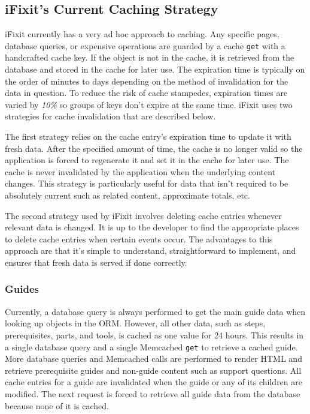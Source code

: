 \documentclass[12pt]{ucthesis}
\begin{document}
\subsection{iFixit's Current Caching Strategy}
\textsf{iFixit} currently has a very ad hoc approach to caching.
Any specific pages, database queries, or expensive operations are guarded by a cache {\tt get} with a handcrafted cache key.
If the object is not in the cache, it is retrieved from the database and stored in the cache for later use.
The expiration time is typically on the order of minutes to days depending on the method of invalidation for the data in question.
To reduce the risk of cache stampedes, expiration times are varied by \textit{10\%} so groups of keys don't expire at the same time.
\textsf{iFixit} uses two strategies for cache invalidation that are described below.

The first strategy relies on the cache entry's expiration time to update it with fresh data.
After the specified amount of time, the cache is no longer valid so the application is forced to regenerate it and set it in the cache for later use.
The cache is never invalidated by the application when the underlying content changes.
This strategy is particularly useful for data that isn't required to be absolutely current such as related content, approximate totals, etc.

The second strategy used by \textsf{iFixit} involves deleting cache entries whenever relevant data is changed.
It is up to the developer to find the appropriate places to delete cache entries when certain events occur.
The advantages to this approach are that it's simple to understand, straightforward to implement, and ensures that fresh data is served if done correctly.

\subsubsection{Guides}
Currently, a database query is always performed to get the main guide data when looking up objects in the ORM\@.
However, all other data, such as steps, prerequisites, parts, and tools, is cached as one value for 24 hours.
This results in a single database query and a single \textsf{Memcached} {\tt get} to retrieve a cached guide.
More database queries and \textsf{Memcached} calls are performed to render HTML and retrieve prerequisite guides and non-guide content such as support questions.
All cache entries for a guide are invalidated when the guide or any of its children are modified.
The next request is forced to retrieve all guide data from the database because none of it is cached.
\end{document}
